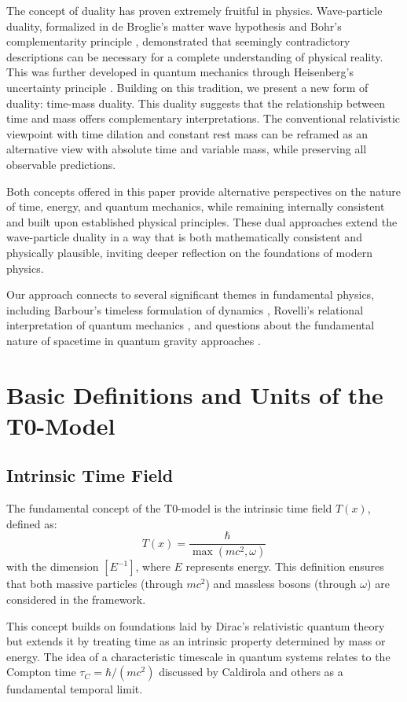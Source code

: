 \documentclass[a4paper,12pt]{article}
\newcommand{\Tfield}{T(x)}
\begin{document}
	The concept of duality has proven extremely fruitful in physics. Wave-particle duality, formalized in de Broglie's matter wave hypothesis \cite{deBroglie1923} and Bohr's complementarity principle \cite{Bohr1928}, demonstrated that seemingly contradictory descriptions can be necessary for a complete understanding of physical reality. This was further developed in quantum mechanics through Heisenberg's uncertainty principle \cite{Heisenberg1927}. Building on this tradition, we present a new form of duality: time-mass duality. This duality suggests that the relationship between time and mass offers complementary interpretations. The conventional relativistic viewpoint with time dilation and constant rest mass can be reframed as an alternative view with absolute time and variable mass, while preserving all observable predictions.
	
	Both concepts offered in this paper provide alternative perspectives on the nature of time, energy, and quantum mechanics, while remaining internally consistent and built upon established physical principles. These dual approaches extend the wave-particle duality in a way that is both mathematically consistent and physically plausible, inviting deeper reflection on the foundations of modern physics.
	
	Our approach connects to several significant themes in fundamental physics, including Barbour's timeless formulation of dynamics \cite{Barbour1994}, Rovelli's relational interpretation of quantum mechanics \cite{Rovelli1996}, and questions about the fundamental nature of spacetime in quantum gravity approaches \cite{Oriti2014}.
	
	\section{Basic Definitions and Units of the T0-Model}
	
	\subsection{Intrinsic Time Field}
	The fundamental concept of the T0-model is the intrinsic time field $\Tfield$, defined as:
	\[
	\Tfield = \frac{\hbar}{\max(mc^2, \omega)}
	\]
	with the dimension $[E^{-1}]$, where $E$ represents energy. This definition ensures that both massive particles (through $mc^2$) and massless bosons (through $\omega$) are considered in the framework.
	
	This concept builds on foundations laid by Dirac's relativistic quantum theory \cite{Dirac1928} but extends it by treating time as an intrinsic property determined by mass or energy. The idea of a characteristic timescale in quantum systems relates to the Compton time $\tau_C = \hbar/(mc^2)$ discussed by Caldirola \cite{Caldirola1976} and others as a fundamental temporal limit.
	
\end{document}
